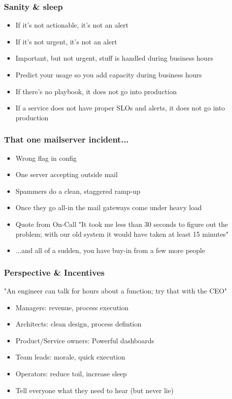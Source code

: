 \documentclass[t]{beamer}
\begin{document}
\begin{frame}
	\frametitle{Sanity \& sleep}
	\begin{itemize}
		\item If it's not actionable, it's not an alert
		\item If it's not urgent, it's not an alert
		\item Important, but not urgent, stuff is handled during business hours
		\item Predict your usage so you add capacity during business hours
		\item If there's no playbook, it does not go into production
		\item If a service does not have proper SLOs and alerts, it does not go into production
	\end{itemize}
\end{frame}

\begin{frame}
	\frametitle{That one mailserver incident...}
	\begin{itemize}
		\item Wrong flag in config
		\item One server accepting outside mail
		\item Spammers do a clean, staggered ramp-up
		\item Once they go all-in the mail gateways come under heavy load
		\item Quote from On-Call "It took me less than 30 seconds to figure out the problem; with our old system it would have taken at least 15 minutes"
		\item ...and all of a sudden, you have buy-in from a few more people
	\end{itemize}
\end{frame}

\begin{frame}
	\frametitle{Perspective \& Incentives}
	"An engineer can talk for hours about a function; try that with the CEO"
	\vfill
	\begin{itemize}
		\item Managers: revenue, process execution
		\item Architects: clean design, process defintion
		\item Product/Service owners: Powerful dashboards
		\item Team leads: morale, quick execution
		\item Operators: reduce toil, increase sleep
		\item Tell everyone what they need to hear (but never lie)
	\end{itemize}
	\vfill
\end{frame}
\end{document}
